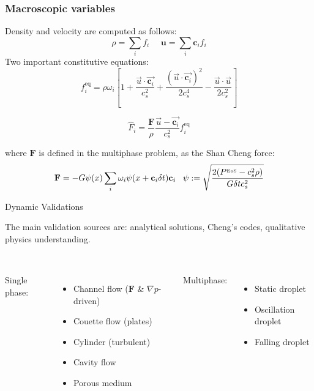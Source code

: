 \documentclass[8pt]{beamer}
\begin{document}
	
	\begin{frame}
		\frametitle{Macroscopic variables}
		Density and velocity are computed as follows:
		\begin{equation}
			\rho = \sum_i f_i \, \, \, \, \, \, \, \,  \mathbf{u} = \sum_i \mathbf{c}_i f_i
		\end{equation}
		Two important constitutive equations:
		\begin{equation*}
			f_i^{\text{eq}} = \rho \omega_i \left[ 1 + \frac{\vec{u}\cdot \vec{\mathbf{c}_i}}{c^2_s} + \frac{(\vec{u}\cdot \vec{\mathbf{c}_i})^2}{2c^4_s}-  \frac{\vec{u}\cdot \vec{u}}{2c^2_s} \right]
		\end{equation*}
		
		\begin{equation*}
			\hat{F}_i = \frac{\mathbf{F}}{\rho} \frac{\vec{u} - \vec{\mathbf{c}_i}}{c^2_s} f_i^{\text{eq}}  
		\end{equation*}
		
		where $\mathbf{F}$ is defined in the multiphase problem, as the Shan Cheng force:
		\begin{equation}
			\mathbf{F} = -G \psi(x) \sum_i \omega_i \psi(x+\mathbf{c}_i \delta t) \mathbf{c}_i \, \, \, \, \, \psi := \sqrt{\frac{2(P^{\text{\tiny EoS}}-c_s^2\rho)}{G \delta t c_s^2}}
		\end{equation}
	\end{frame}
	
	\begin{frame}{Dynamic Validations}
		
		The main validation sources are: analytical solutions, Cheng's codes, qualitative physics understanding.\\~\\
		
		
		\begin{columns}[T]
			
			Single phase:
			\begin{itemize}
				\item Channel flow ($\mathbf{F}$ \& $\nabla p$-driven)
				\item Couette flow (plates)
				\item Cylinder (turbulent)
				\item Cavity flow
				\item Porous medium
			\end{itemize}
			
			Multiphase:
			\begin{itemize}
				\item Static droplet
				\item Oscillation droplet
				\item Falling droplet
			\end{itemize}
		\end{columns}
	\end{frame}
	
\end{document}
